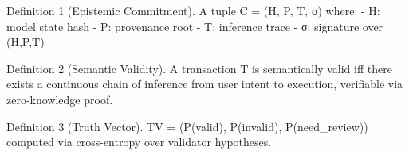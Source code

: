 Definition 1 (Epistemic Commitment).  
A tuple C = (H, P, T, σ) where:
- H: model state hash
- P: provenance root
- T: inference trace
- σ: signature over (H,P,T)

Definition 2 (Semantic Validity).  
A transaction T is semantically valid iff there exists a continuous chain of inference from user intent to execution, verifiable via zero-knowledge proof.

Definition 3 (Truth Vector).  
TV = (P(valid), P(invalid), P(need_review)) computed via cross-entropy over validator hypotheses.
